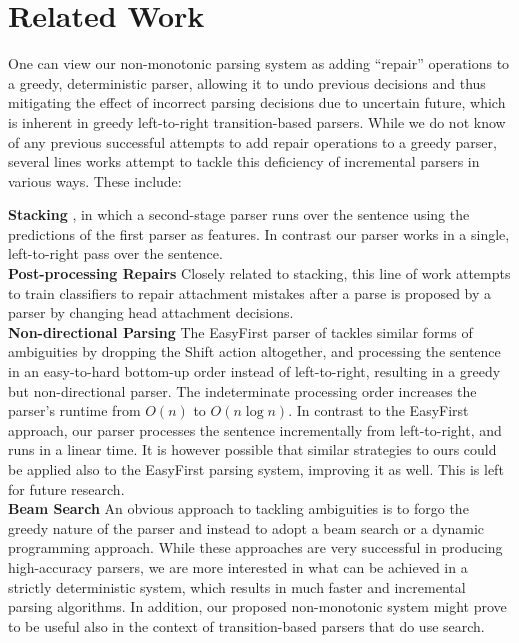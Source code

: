 \documentclass[11pt,letterpaper]{article}
\begin{document}
\section{Related Work}

One can view our non-monotonic parsing system as adding ``repair'' operations to a greedy, deterministic parser, allowing it to undo previous decisions and thus mitigating the effect of incorrect parsing decisions due to uncertain future, which is inherent in greedy left-to-right transition-based parsers. 
While we do not know of any previous successful attempts to add repair operations to a greedy parser, several lines works attempt to tackle this deficiency of incremental parsers in various ways. These include:

\noindent\textbf{Stacking} \citep{nivre-mcdonald-stacking,torresmartins:08:stacking}, in which a second-stage parser runs over the sentence using the predictions of the first parser as features. In contrast our parser works in a single, left-to-right pass over the sentence.\\
\noindent\textbf{Post-processing Repairs} \citep{attardi:07,hall05iwpt}
Closely related to stacking, this line of work attempts to train classifiers
to repair attachment mistakes after a parse is proposed by a parser by
changing head attachment decisions.\\
\noindent\textbf{Non-directional Parsing} 
The EasyFirst parser of \citet{goldberg10}
tackles similar forms of
ambiguities by dropping the Shift action altogether, and processing the
sentence in an easy-to-hard bottom-up order instead of left-to-right,
resulting in a greedy but non-directional parser.  The indeterminate
processing order increases the parser's runtime from $O(n)$ to $O(n\log{}n)$.
In contrast to the EasyFirst approach, our parser processes the sentence
incrementally from left-to-right, and runs in a linear time.  It is however
possible that similar strategies to ours could be applied also to the
EasyFirst parsing system, improving it as well. This is left for future
research.\\
\noindent\textbf{Beam Search} An obvious approach to tackling
ambiguities is to forgo the greedy nature of the parser and instead to adopt a
beam search \citep{zhang:08,zhang:11} or a dynamic programming \citep{huang:10,kuhlmann:11}
approach. While these approaches are very successful in producing
high-accuracy parsers, we are more interested in what can be achieved in a
strictly deterministic system, which results in much faster and incremental
parsing algorithms.  In addition, our proposed non-monotonic system might
prove to be useful also in the context of transition-based parsers that do use
search.
\end{document}
